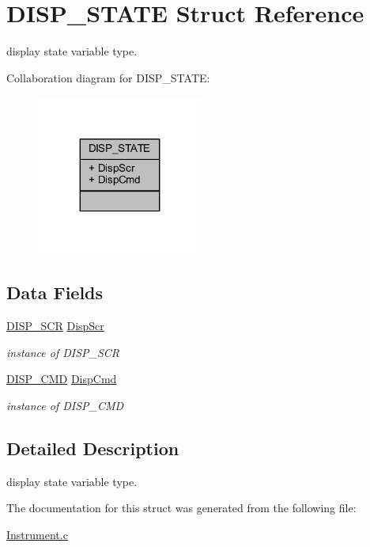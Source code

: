 \hypertarget{struct_d_i_s_p___s_t_a_t_e}{}\section{D\+I\+S\+P\+\_\+\+S\+T\+A\+TE Struct Reference}
\label{struct_d_i_s_p___s_t_a_t_e}


display state variable type.  




Collaboration diagram for D\+I\+S\+P\+\_\+\+S\+T\+A\+TE\+:
\nopagebreak
\begin{figure}[H]
\begin{center}
\leavevmode
\includegraphics[width=155pt]{struct_d_i_s_p___s_t_a_t_e__coll__graph}
\end{center}
\end{figure}
\subsection*{Data Fields}
\begin{DoxyCompactItemize}
\item 
\mbox{\label{struct_d_i_s_p___s_t_a_t_e_a8aadcc7541a9e80b0359d16f69cf8236}} 
\hyperlink{_instrument_8c_a5e9ecb1d572f0c8d6aa7f5a2a4249551}{D\+I\+S\+P\+\_\+\+S\+CR} \hyperlink{struct_d_i_s_p___s_t_a_t_e_a8aadcc7541a9e80b0359d16f69cf8236}{Disp\+Scr}
\begin{DoxyCompactList}\small\item\em instance of D\+I\+S\+P\+\_\+\+S\+CR \end{DoxyCompactList}\item 
\mbox{\label{struct_d_i_s_p___s_t_a_t_e_a645e5556d0f7f16a2d1239ab815951a5}} 
\hyperlink{_instrument_8c_ab38156ce3b27d67dd5e4d2ad7fc2511b}{D\+I\+S\+P\+\_\+\+C\+MD} \hyperlink{struct_d_i_s_p___s_t_a_t_e_a645e5556d0f7f16a2d1239ab815951a5}{Disp\+Cmd}
\begin{DoxyCompactList}\small\item\em instance of D\+I\+S\+P\+\_\+\+C\+MD \end{DoxyCompactList}\end{DoxyCompactItemize}


\subsection{Detailed Description}
display state variable type. 

The documentation for this struct was generated from the following file\+:\begin{DoxyCompactItemize}
\item 
\hyperlink{_instrument_8c}{Instrument.\+c}\end{DoxyCompactItemize}
